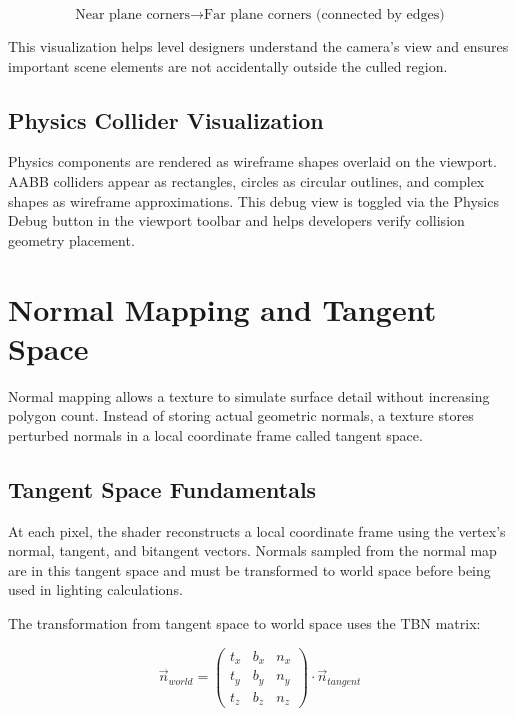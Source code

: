 \begin{equation}
    \text{Near plane corners} \to \text{Far plane corners (connected by edges)}
\end{equation}

This visualization helps level designers understand the camera's view and ensures important scene elements are not accidentally outside the culled region.

\subsection{Physics Collider Visualization}

Physics components are rendered as wireframe shapes overlaid on the viewport. AABB colliders appear as rectangles, circles as circular outlines, and complex shapes as wireframe approximations. This debug view is toggled via the Physics Debug button in the viewport toolbar and helps developers verify collision geometry placement.

\section{Normal Mapping and Tangent Space}

Normal mapping allows a texture to simulate surface detail without increasing polygon count. Instead of storing actual geometric normals, a texture stores perturbed normals in a local coordinate frame called tangent space.

\subsection{Tangent Space Fundamentals}

At each pixel, the shader reconstructs a local coordinate frame using the vertex's normal, tangent, and bitangent vectors. Normals sampled from the normal map are in this tangent space and must be transformed to world space before being used in lighting calculations.

The transformation from tangent space to world space uses the TBN matrix:

\begin{equation}
    \vec{n}_{world} = \begin{pmatrix} t_x & b_x & n_x \\ t_y & b_y & n_y \\ t_z & b_z & n_z \end{pmatrix} \cdot \vec{n}_{tangent}
\end{equation}

